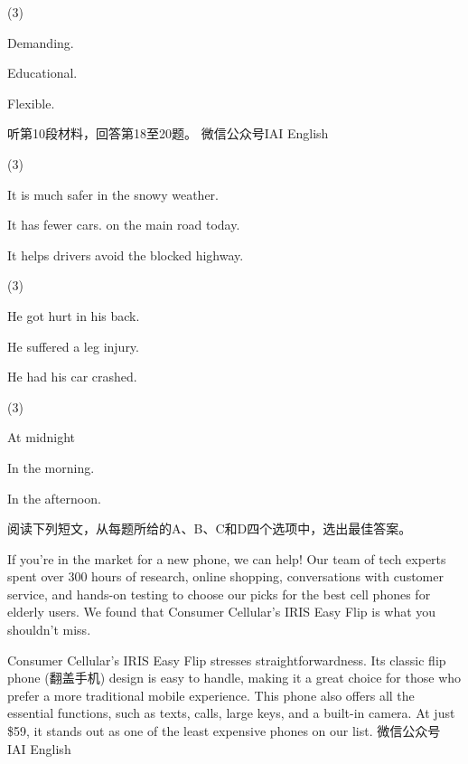 \documentclass{英语试卷}
\begin{document}
\begin{choices}(3)
  \item Demanding.
  \item Educational.
  \item Flexible.
\end{choices}
\par 听第10段材料，回答第18至20题。 微信公众号IAI English\par
{}
\begin{choices}(3)
  \item It is much safer in the snowy weather.
  \item It has fewer cars. on the main road today.
  \item It helps drivers avoid the blocked highway.
\end{choices}
\begin{choices}(3)
  \item He got hurt in his back.
  \item He suffered a leg injury.
  \item He had his car crashed.
\end{choices}
\begin{choices}(3)
  \item At midnight
  \item In the morning.
  \item In the afternoon.
\end{choices}
\par 阅读下列短文，从每题所给的A、B、C和D四个选项中，选出最佳答案。\par
{}
\par If you're in the market for a new phone, we can help! Our team of tech experts spent over 300 hours of research, online shopping, conversations with customer service, and hands-on testing to choose our picks for the best cell phones for elderly users. We found that Consumer Cellular's IRIS Easy Flip is what you shouldn't miss.\par
\par Consumer Cellular's IRIS Easy Flip stresses straightforwardness. Its classic flip phone (翻盖手机) design is easy to handle, making it a great choice for those who prefer a more traditional mobile experience. This phone also offers all the essential functions, such as texts, calls, large keys, and a built-in camera. At just \$59, it stands out as one of the least expensive phones on our list. 微信公众号 IAI English\par
\end{document}
